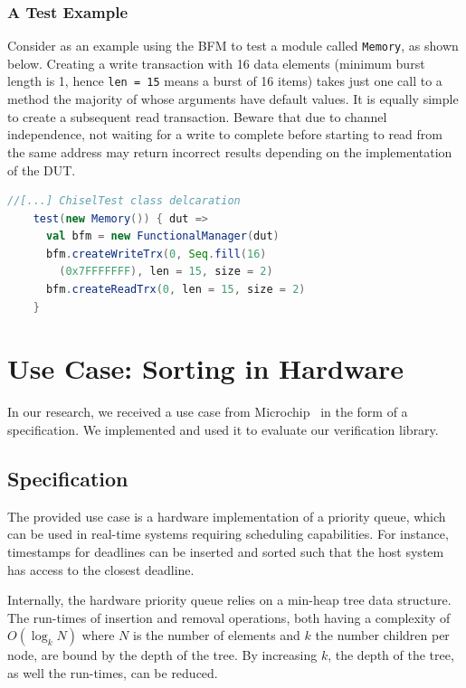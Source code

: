 \documentclass[conference]{IEEEtran}
\begin{document}
\subsubsection{A Test Example}
Consider as an example using the BFM to test a module called \texttt{Memory}, as shown below. Creating a write transaction with 16 data elements (minimum burst length is 1, hence \texttt{len = 15} means a burst of 16 items) takes just one call to a method the majority of whose arguments have default values. It is equally simple to create a subsequent read transaction. Beware that due to channel independence, not waiting for a write to complete before starting to read from the same address may return incorrect results depending on the implementation of the DUT.
\begin{lstlisting}[language=scala, caption={Using the AXI4 BFM with ChiselTest}, label={lst:axitest}]
//[...] ChiselTest class delcaration
    test(new Memory()) { dut =>
      val bfm = new FunctionalManager(dut)
      bfm.createWriteTrx(0, Seq.fill(16)
      	(0x7FFFFFFF), len = 15, size = 2)
      bfm.createReadTrx(0, len = 15, size = 2)
    }
\end{lstlisting}

\section{Use Case: Sorting in Hardware}

In our research, we received a use case from Microchip~\cite{microchip} in the form of a specification.
We implemented and used it to evaluate our verification library.

\subsection{Specification}

The provided use case is a hardware implementation of a priority queue, which can be used in real-time systems requiring scheduling capabilities. 
For instance, timestamps for deadlines can be inserted and sorted such that the host system has access to the closest deadline.

Internally, the hardware priority queue relies on a min-heap tree data structure. 
The run-times of insertion and removal operations, both having a complexity of $O(\log_k N)$ where $N$ is the number of elements and $k$ the number children per node, are bound by the depth of the tree. 
By increasing $k$, the depth of the tree, as well the run-times, can be reduced.
\end{document}
